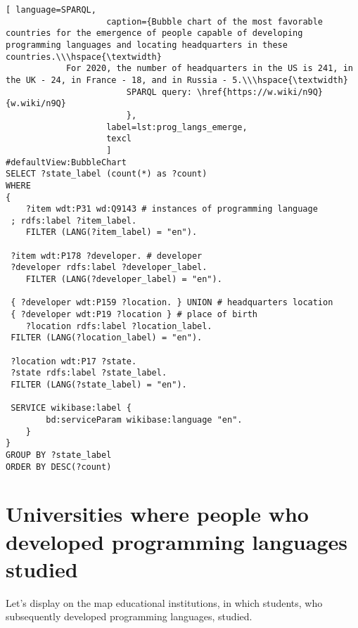 \begin{lstlisting}[ language=SPARQL, 
                    caption={Bubble chart of the most favorable countries for the emergence of people capable of developing programming languages and locating headquarters in these countries.\\\hspace{\textwidth}
			For 2020, the number of headquarters in the US is 241, in the UK - 24, in France - 18, and in Russia - 5.\\\hspace{\textwidth}
                        SPARQL query: \href{https://w.wiki/n9Q}{w.wiki/n9Q}
                        },
                    label=lst:prog_langs_emerge,
                    texcl 
                    ]
#defaultView:BubbleChart
SELECT ?state_label (count(*) as ?count)
WHERE
{
 	?item wdt:P31 wd:Q9143 # instances of programming language
 ; rdfs:label ?item_label. 
 	FILTER (LANG(?item_label) = "en"). 
 
 ?item wdt:P178 ?developer. # developer
 ?developer rdfs:label ?developer_label. 
 	FILTER (LANG(?developer_label) = "en"). 
 		
 { ?developer wdt:P159 ?location. } UNION # headquarters location
 { ?developer wdt:P19 ?location } # place of birth
 	?location rdfs:label ?location_label. 
 FILTER (LANG(?location_label) = "en").
 
 ?location wdt:P17 ?state.
 ?state rdfs:label ?state_label. 
 FILTER (LANG(?state_label) = "en").

 SERVICE wikibase:label {
		bd:serviceParam wikibase:language "en".
	} 	
}
GROUP BY ?state_label
ORDER BY DESC(?count)
\end{lstlisting}%


\section{Universities where people who developed programming languages studied}
Let's display on the map educational institutions, in which students, who subsequently developed programming languages, studied.

